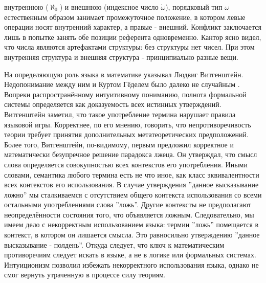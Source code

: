 \documentclass[12pt]{article}
\begin{document}
внутреннюю ($\aleph_0$) и внешнюю (индексное число $\dot{\omega}$), порядковый тип $\omega$ естественным образом занимает промежуточное положение, в котором левые операции носят внутренний характер, а правые - внешний. Конфликт заключается лишь в попытке занять обе позиции референта одновременно. Кантор ясно видел, что числа являются артефактами структуры: без структуры нет чисел. При этом внутренняя структура и внешняя структура - принципиально разные вещи.

На определяющую роль языка в математике указывал Людвиг Витгенштейн. Недопонимание между ним и Куртом Гёделем было далеко не случайным \cite{wittgenstein-godel}. Вопреки распространённому интуитивному пониманию, полнота формальной системы определяется как доказуемость всех истинных утверждений. Витгенштейн заметил, что такое употребление термина нарушает правила языковой игры. Корректнее, по его мнению, говорить, что непротиворечивость теории требует принятия дополнительных метатеоретических предположений. Более того, Витгенштейн, по-видимому, первым предложил корректное и математически безупречное решение парадокса лжеца. Он утверждал, что смысл слова определяется совокупностью всех контекстов его употребления. Иными словами, семантика любого термина есть не что иное, как класс эквивалентности всех контекстов его использования. В случае утверждения ''данное высказывание ложно'' мы сталкиваемся с отсутствием общего контекста использования со всеми остальными употреблениями слова ''ложь''. Другие контексты не предполагают неопределённости состояния того, что объявляется ложным. Следовательно, мы имеем дело с некорректным использованием языка: термин ''ложь'' помещается в контекст, в котором он лишается смысла. Это равносильно утверждению ''данное высказывание - полдень''. Откуда следует, что ключ к математическим противоречиям следует искать в языке, а не в логике или формальных системах. Интуиционизм позволил избежать некорректного использования языка, однако не смог вернуть утраченную в процессе силу теориям. 
\end{document}
